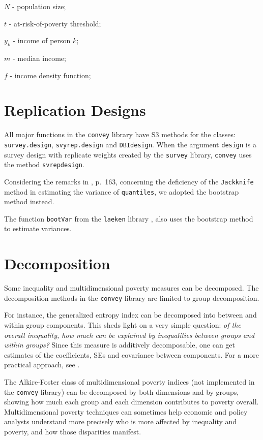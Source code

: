 \documentclass[
]{book}
\begin{document}
\(N\) - population size;

\(t\) - at-risk-of-poverty threshold;

\(y_k\) - income of person \(k\);

\(m\) - median income;

\(f\) - income density function;

\hypertarget{replication-designs}{%
\section{Replication Designs}\label{replication-designs}}

All major functions in the \texttt{convey} library have S3 methods for the classes: \texttt{survey.design}, \texttt{svyrep.design} and \texttt{DBIdesign}. When the argument \texttt{design} is a survey design with replicate weights created by the \texttt{survey} library, \texttt{convey} uses the method \texttt{svrepdesign}.

Considering the remarks in \autocite{W85}, p.~163, concerning the deficiency of the \texttt{Jackknife} method in estimating the variance of \texttt{quantiles}, we adopted the bootstrap method instead.

The function \texttt{bootVar} from the \texttt{laeken} library \autocite{R-laeken}, also uses the bootstrap method to estimate variances.

\hypertarget{decomposition}{%
\section{Decomposition}\label{decomposition}}

Some inequality and multidimensional poverty measures can be decomposed. The decomposition methods in the \texttt{convey} library are limited to group decomposition.

For instance, the generalized entropy index can be decomposed into between and within group components. This sheds light on a very simple question: \emph{of the overall inequality, how much can be explained by inequalities between groups and within groups?} Since this measure is additively decomposable, one can get estimates of the coefficients, SEs and covariance between components. For a more practical approach, see \autocite{lima2013}.

The Alkire-Foster class of multidimensional poverty indices (not implemented in the \texttt{convey} library) can be decomposed by both dimensions and by groups, showing how much each group and each dimension contributes to poverty overall. Multidimensional poverty techniques can sometimes help economic and policy analysts understand more precisely who is more affected by inequality and poverty, and how those disparities manifest.
\end{document}
